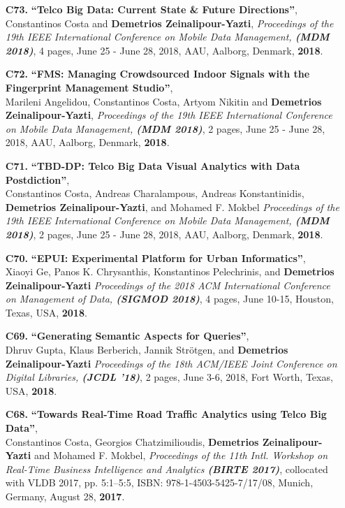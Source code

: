 \documentclass[10pt]{article}
\begin{document}
\begin{enumerate}
\item[{\bf C73.}]
\label{C73} %
{\bf ``Telco Big Data: Current State \& Future Directions''}, \\
Constantinos Costa and {\bf Demetrios Zeinalipour-Yazti},
{\em Proceedings of the 19th IEEE International Conference on Mobile Data Management, {\bf (MDM 2018)}}, 4 pages, June 25 - June 28, 2018, AAU, Aalborg, Denmark, {\bf 2018}.

\item[{\bf C72.}]
\label{C72} %
{\bf ``FMS: Managing Crowdsourced Indoor Signals with the Fingerprint Management Studio''}, \\
Marileni Angelidou, Constantinos Costa, Artyom Nikitin and {\bf Demetrios Zeinalipour-Yazti},
{\em Proceedings of the 19th IEEE International Conference on Mobile Data Management, {\bf (MDM 2018)}}, 2 pages, June 25 - June 28, 2018, AAU, Aalborg, Denmark, {\bf 2018}.

\item[{\bf C71.}]
\label{C71} %
{\bf ``TBD-DP: Telco Big Data Visual Analytics with Data Postdiction''}, \\
Constantinos Costa, Andreas Charalampous, Andreas Konstantinidis, {\bf Demetrios Zeinalipour-Yazti}, and Mohamed F. Mokbel
{\em Proceedings of the 19th IEEE International Conference on Mobile Data Management, {\bf (MDM 2018)}}, 2 pages, June 25 - June 28, 2018, AAU, Aalborg, Denmark, {\bf 2018}.

\item[{\bf C70.}]
\label{C70} %
{\bf ``EPUI: Experimental Platform for Urban Informatics''}, \\
Xiaoyi Ge, Panos K. Chrysanthis, Konstantinos Pelechrinis, and {\bf Demetrios Zeinalipour-Yazti}
{\em Proceedings of the 2018 ACM International Conference on Management of Data, {\bf (SIGMOD 2018)}}, 4 pages, June 10-15, Houston, Texas, USA, {\bf 2018}.

\item[{\bf C69.}]
\label{C69} %
{\bf ``Generating Semantic Aspects for Queries''}, \\
Dhruv Gupta, Klaus Berberich, Jannik Strötgen, and {\bf Demetrios Zeinalipour-Yazti}
{\em Proceedings of the 18th ACM/IEEE Joint Conference on Digital Libraries, {\bf (JCDL '18)}}, 2 pages, June 3-6, 2018, Fort Worth, Texas, USA, {\bf 2018}.

\item[{\bf C68.}]
\label{C68} %
{\bf ``Towards Real-Time Road Traffic Analytics using Telco Big Data''}, \\
Constantinos Costa, Georgios Chatzimilioudis, {\bf Demetrios Zeinalipour-Yazti} and Mohamed F. Mokbel,
{\em Proceedings of the 11th Intl. Workshop on Real-Time Business Intelligence and Analytics {\bf (BIRTE 2017)}}, collocated with VLDB 2017, pp. 5:1--5:5, ISBN: 978-1-4503-5425-7/17/08, Munich, Germany, August 28, {\bf 2017}.


\end{enumerate}
\end{document}

